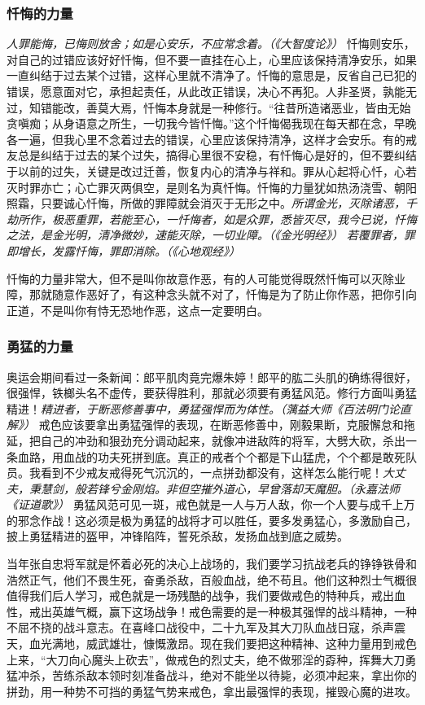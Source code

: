 \subsubsection{忏悔的力量}

\textit{人罪能悔，已悔则放舍；如是心安乐，不应常念着。（《大智度论》）} 忏悔则安乐，对自己的过错应该好好忏悔，但不要一直挂在心上，心里应该保持清净安乐，如果一直纠结于过去某个过错，这样心里就不清净了。忏悔的意思是，反省自己已犯的错误，愿意面对它，承担起责任，从此改正错误，决心不再犯。人非圣贤，孰能无过，知错能改，善莫大焉，忏悔本身就是一种修行。“往昔所造诸恶业，皆由无始贪嗔痴；从身语意之所生，一切我今皆忏悔。”这个忏悔偈我现在每天都在念，早晚各一遍，但我心里不念着过去的错误，心里应该保持清净，这样才会安乐。有的戒友总是纠结于过去的某个过失，搞得心里很不安稳，有忏悔心是好的，但不要纠结于以前的过失，关键是改过迁善，恢复内心的清净与祥和。罪从心起将心忏，心若灭时罪亦亡；心亡罪灭两俱空，是则名为真忏悔。忏悔的力量犹如热汤浇雪、朝阳照霜，只要诚心忏悔，所做的罪障就会消灭于无形之中。\textit{所谓金光，灭除诸恶，千劫所作，极恶重罪，若能至心，一忏悔者，如是众罪，悉皆灭尽，我今已说，忏悔之法，是金光明，清净微妙，速能灭除，一切业障。（《金光明经》）} \textit{若覆罪者，罪即增长，发露忏悔，罪即消除。（《心地观经》）}

忏悔的力量非常大，但不是叫你故意作恶，有的人可能觉得既然忏悔可以灭除业障，那就随意作恶好了，有这种念头就不对了，忏悔是为了防止你作恶，把你引向正道，不是叫你有恃无恐地作恶，这点一定要明白。

\subsubsection{勇猛的力量}

奥运会期间看过一条新闻：郎平肌肉竟完爆朱婷！郎平的肱二头肌的确练得很好，很强悍，铁榔头名不虚传，要获得胜利，那就必须要有勇猛风范。修行方面叫勇猛精进！\textit{精进者，于断恶修善事中，勇猛强悍而为体性。（蕅益大师《百法明门论直解》）} 戒色应该要拿出勇猛强悍的表现，在断恶修善中，刚毅果断，克服懈怠和拖延，把自己的冲劲和狠劲充分调动起来，就像冲进敌阵的将军，大劈大砍，杀出一条血路，用血战的功夫死拼到底。真正的戒者个个都是下山猛虎，个个都是敢死队员。我看到不少戒友戒得死气沉沉的，一点拼劲都没有，这样怎么能行呢！\textit{大丈夫，秉慧剑，般若锋兮金刚焰。非但空摧外道心，早曾落却天魔胆。（永嘉法师《证道歌》）} 勇猛风范可见一斑，戒色就是一人与万人敌，你一个人要与成千上万的邪念作战！这必须是极为勇猛的战将才可以胜任，要多发勇猛心，多激励自己，披上勇猛精进的盔甲，冲锋陷阵，誓死杀敌，发扬血战到底之威势。

当年张自忠将军就是怀着必死的决心上战场的，我们要学习抗战老兵的铮铮铁骨和浩然正气，他们不畏生死，奋勇杀敌，百般血战，绝不苟且。他们这种烈士气概很值得我们后人学习，戒色就是一场残酷的战争，我们要做戒色的特种兵，戒出血性，戒出英雄气概，赢下这场战争！戒色需要的是一种极其强悍的战斗精神，一种不屈不挠的战斗意志。在喜峰口战役中，二十九军及其大刀队血战日寇，杀声震天，血光满地，威武雄壮，慷慨激昂。现在我们要把这种精神、这种力量用到戒色上来，“大刀向心魔头上砍去”，做戒色的烈丈夫，绝不做邪淫的孬种，挥舞大刀勇猛冲杀，苦练杀敌本领时刻准备战斗，绝对不能坐以待毙，必须冲起来，拿出你的拼劲，用一种势不可挡的勇猛气势来戒色，拿出最强悍的表现，摧毁心魔的进攻。

